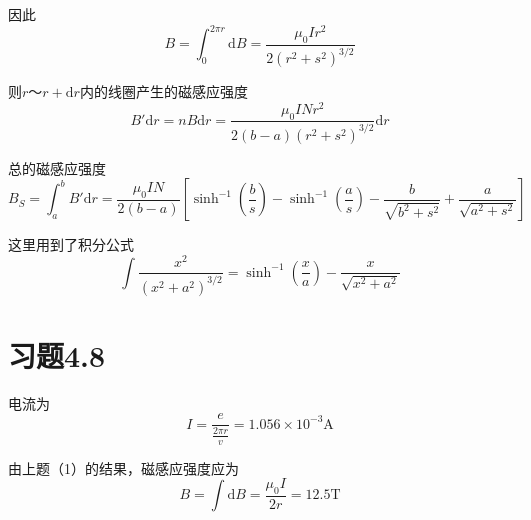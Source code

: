 \documentclass{SCIS2020cn}
\begin{document}
因此
\begin{equation}
    B=\int_0^{2\pi{}r}\text{d}B=\frac{\mu_0Ir^2}{2(r^2+s^2)^{3/2}}
\end{equation}

则$r$～$r+\text{d}r$内的线圈产生的磁感应强度
\begin{equation}
    B'\text{d}r=nB\text{d}r=\frac{\mu_0INr^2}{2(b-a)(r^2+s^2)^{3/2}}\text{d}r
\end{equation}

总的磁感应强度
\begin{equation}
    B_{S}=\int_a^b{}B'\text{d}r=\frac{\mu_0IN}{2(b-a)}\left[\sinh^{-1}(\frac{b}{s})-\sinh^{-1}(\frac{a}{s})-\frac{b}{\sqrt{b^2+s^2}}+\frac{a}{\sqrt{a^2+s^2}}\right]
\end{equation}

这里用到了积分公式
\begin{equation}
    \int\frac{x^2}{(x^2+a^2)^{3/2}}=\sinh^{-1}(\frac{x}{a})-\frac{x}{\sqrt{x^2+a^2}}
\end{equation}

\section{习题4.8}
电流为
\begin{equation}
    I=\frac{e}{\frac{2\pi{}r}{v}}=1.056×10^{-3}\text{A}
\end{equation}

由上题（1）的结果，磁感应强度应为
\begin{equation}
    B=\int\text{d}B=\frac{\mu_0I}{2r}=12.5\text{T}
\end{equation}
\end{document}
